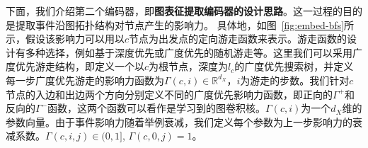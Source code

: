 \documentclass[12pt,UTF8,AutoFakeBold=2,a4paper]{ctexart} %
\begin{document}
下面，我们介绍第二个编码器，即\textbf{图表征提取编码器的设计思路}。这一过程的目的是提取事件沿图拓扑结构对节点产生的影响力。%
具体地，如图~\ref{fig:embed-bfs}所示，假设该影响力可以用以$c$节点为出发点的定向游走函数来表示。游走函数的设计有多种选择，例如基于深度优先或广度优先的随机游走等。这里我们可以采用广度优先游走结构，即定义一个以$c$为根节点，深度为$l_c$的广度优先搜索树，并定义每一步广度优先游走的影响力函数为$\Gamma(c,i)\in\mathbb{R}^{d_X}$，$i$为游走的步数。我们针对$c$节点的入边和出边两个方向分别定义不同的广度优先影响力函数，即正向的$\Gamma^+$和反向的$\Gamma^-$函数，这两个函数可以看作是学习到的图卷积核。$\Gamma(c,i)$为一个$d_X$维的参数向量。由于事件影响力随着举例衰减，我们定义每个参数为上一步影响力的衰减系数。$\Gamma(c,i,j) \in (0,1]$, $\Gamma(c,0, j)=1$。
\end{document}
